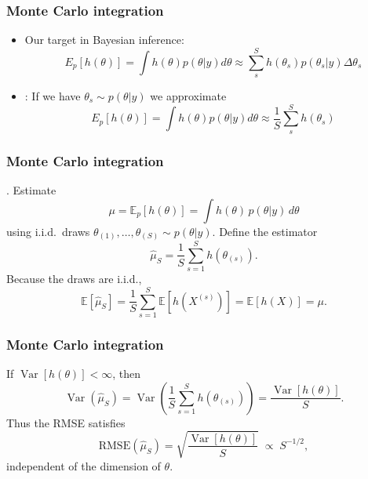 \documentclass[10pt]{beamer}
\begin{document}
\begin{frame}
\frametitle{Monte Carlo integration}

  \begin{itemize}
    \item Our target in Bayesian inference:
    \[
      E_{p}[h(\theta)] = \int h(\theta) p(\theta|y) d\theta \approx \sum_s^S h(\theta_s) p(\theta_s|y) \Delta \theta_{s}
    \]
    \pause
    \item {}: If we have $\theta_s \sim p(\theta|y)$ we approximate
        \[
      E_{p}[h(\theta)] = \int h(\theta) p(\theta|y) d\theta \approx \frac{1}{S} \sum_s^S h(\theta_s)
    \]

  \end{itemize}


\end{frame}

\begin{frame}
\frametitle{Monte Carlo integration}

. Estimate
\[
\mu = \mathbb{E}_p[h(\theta)] = \int h(\theta)\,p(\theta|y)\,d\theta
\]
using i.i.d.\ draws $\theta_{(1)},\dots,\theta_{(S)} \sim p(\theta|y)$.
Define the estimator
\[
\hat{\mu}_S = \frac{1}{S}\sum_{s=1}^S h(\theta_{(s)}).
\]
\pause
\medskip
{}
Because the draws are i.i.d.,
\[
\mathbb{E}[\hat{\mu}_S]
= \frac{1}{S}\sum_{s=1}^S \mathbb{E}[h(X^{(s)})]
= \mathbb{E}[h(X)]
= \mu.
\]


\end{frame}


\begin{frame}
\frametitle{Monte Carlo integration}

If $\operatorname{Var}[h(\theta)] < \infty$, then
\[
\operatorname{Var}(\hat{\mu}_S)
= \operatorname{Var}\!\left(\frac{1}{S}\sum_{s=1}^S h(\theta_{(s)})\right)
= \frac{\operatorname{Var}[h(\theta)]}{S}.
\]
Thus the RMSE satisfies
\[
\mathrm{RMSE}(\hat{\mu}_S)
= \sqrt{\frac{\operatorname{Var}[h(\theta)]}{S}} \;\propto\; S^{-1/2},
\]
independent of the dimension of $\theta$.



\end{frame}
\end{document}
